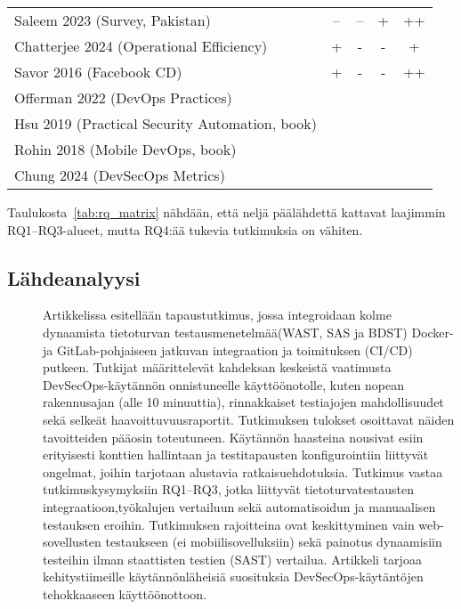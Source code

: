\documentclass[bscthesis,finnish,oneside,biblatex]{uefcsthesis}
\begin{document}
\begin{table}[htbp]
\begin{tabular}{p{5cm}cccc}
    Saleem 2023 (Survey, Pakistan)                   & --  & --  &  +  & ++  \\
    Chatterjee 2024 (Operational Efficiency)         &  +  &  -  &  -  &  +  \\
    Savor 2016 (Facebook CD)                         &  +  &  -  &  -  &  ++ \\
    Offerman 2022 (DevOps Practices)                 &      &     &     &     \\
    Hsu 2019 (Practical Security Automation, book)   &      &     &     &     \\
    Rohin 2018 (Mobile DevOps, book)                 &      &     &     &     \\
    Chung 2024 (DevSecOps Metrics)                   &      &     &     &     \\
    \bottomrule
  \end{tabular}
\end{table}


Taulukosta~\ref{tab:rq_matrix} nähdään, että neljä päälähdettä
kattavat laajimmin RQ1–RQ3-alueet, mutta RQ4:ää tukevia tutkimuksia on
vähiten.

\subsection{Lähdeanalyysi}
\begin{description}
    \item[\cite{rangnau2020_cst}] Artikkelissa esitellään tapaustutkimus, jossa integroidaan kolme dynaamista tietoturvan testausmenetelmää(WAST, SAS ja BDST) Docker- ja GitLab-pohjaiseen jatkuvan integraation ja toimituksen (CI/CD) putkeen. Tutkijat määrittelevät kahdeksan keskeistä vaatimusta DevSecOps-käytännön onnistuneelle käyttöönotolle, kuten nopean rakennusajan (alle 10 minuuttia), rinnakkaiset testiajojen mahdollisuudet sekä selkeät haavoittuvuusraportit. Tutkimuksen tulokset osoittavat näiden tavoitteiden pääosin toteutuneen. Käytännön haasteina nousivat esiin erityisesti konttien hallintaan ja testitapausten konfigurointiin liittyvät ongelmat, joihin tarjotaan alustavia ratkaisuehdotuksia. Tutkimus vastaa tutkimuskysymyksiin RQ1–RQ3, jotka liittyvät tietoturvatestausten integraatioon,työkalujen vertailuun sekä automatisoidun ja manuaalisen testauksen eroihin. Tutkimuksen rajoitteina ovat keskittyminen vain web-sovellusten testaukseen (ei mobiilisovelluksiin) sekä painotus dynaamisiin testeihin ilman staattisten testien (SAST) vertailua. Artikkeli tarjoaa kehitystiimeille käytännönläheisiä suosituksia DevSecOps-käytäntöjen tehokkaaseen käyttöönottoon.
\end{description}
\end{document}
